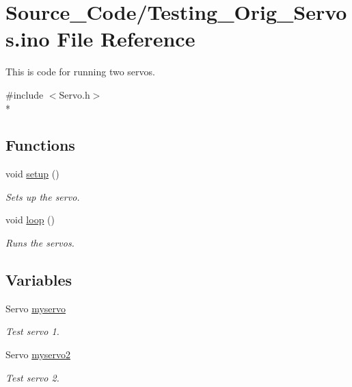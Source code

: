 \hypertarget{_testing___orig___servos_8ino}{\section{Source\-\_\-\-Code/\-Testing\-\_\-\-Orig\-\_\-\-Servos.ino File Reference}
\label{_testing___orig___servos_8ino}
}


This is code for running two servos.  


{\ttfamily \#include $<$Servo.\-h$>$}\\*
\subsection*{Functions}
\begin{DoxyCompactItemize}
\item 
void \hyperlink{_testing___orig___servos_8ino_a4fc01d736fe50cf5b977f755b675f11d}{setup} ()
\begin{DoxyCompactList}\small\item\em Sets up the servo. \end{DoxyCompactList}\item 
void \hyperlink{_testing___orig___servos_8ino_afe461d27b9c48d5921c00d521181f12f}{loop} ()
\begin{DoxyCompactList}\small\item\em Runs the servos. \end{DoxyCompactList}\end{DoxyCompactItemize}
\subsection*{Variables}
\begin{DoxyCompactItemize}
\item 
\hypertarget{_testing___orig___servos_8ino_ab7eaefeafe574cbf45415789bf672403}{Servo \hyperlink{_testing___orig___servos_8ino_ab7eaefeafe574cbf45415789bf672403}{myservo}}\label{_testing___orig___servos_8ino_ab7eaefeafe574cbf45415789bf672403}

\begin{DoxyCompactList}\small\item\em Test servo 1. \end{DoxyCompactList}\item 
\hypertarget{_testing___orig___servos_8ino_ae82ce746c91043cc28f8d2d34b313fdf}{Servo \hyperlink{_testing___orig___servos_8ino_ae82ce746c91043cc28f8d2d34b313fdf}{myservo2}}\label{_testing___orig___servos_8ino_ae82ce746c91043cc28f8d2d34b313fdf}

\begin{DoxyCompactList}\small\item\em Test servo 2. \end{DoxyCompactList}\end{DoxyCompactItemize}


